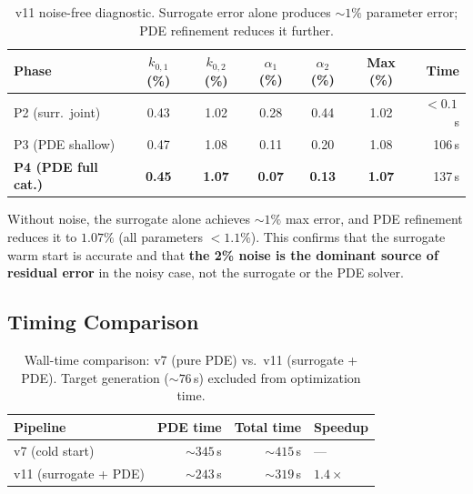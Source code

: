 \documentclass[11pt]{article}
\begin{document}
\begin{table}[htbp]
  \centering
  \caption{v11 noise-free diagnostic.  Surrogate error alone produces
           ${\sim}1\%$ parameter error; PDE refinement reduces it further.}
  \label{tab:v11_noisefree}
  \begin{tabular}{l S[round-precision=2] S[round-precision=2]
                    S[round-precision=2] S[round-precision=2]
                    S[round-precision=2] r}
    \toprule
    Phase & {$k_{0,1}$ (\%)} & {$k_{0,2}$ (\%)}
          & {$\alpha_1$ (\%)} & {$\alpha_2$ (\%)}
          & {Max (\%)} & {Time} \\
    \midrule
    P2 (surr.\ joint)           & 0.43 & 1.02 & 0.28 & 0.44 & 1.02 & $<0.1$\,s \\
    P3 (PDE shallow)            & 0.47 & 1.08 & 0.11 & 0.20 & 1.08 & 106\,s    \\
    \textbf{P4 (PDE full cat.)} &\textbf{0.45} & \textbf{1.07} & \textbf{0.07} & \textbf{0.13}
                                &\textbf{1.07} & 137\,s    \\
    \bottomrule
  \end{tabular}
\end{table}

Without noise, the surrogate alone achieves ${\sim}1\%$ max error, and PDE
refinement reduces it to $1.07\%$ (all parameters $< 1.1\%$).  This confirms
that the surrogate warm start is accurate and that \textbf{the 2\% noise is the
dominant source of residual error} in the noisy case, not the surrogate or
the PDE solver.

\subsection{Timing Comparison}

\begin{table}[htbp]
  \centering
  \caption{Wall-time comparison: v7 (pure PDE) vs.\ v11 (surrogate + PDE).
           Target generation (${\sim}76$\,s) excluded from optimization time.}
  \label{tab:v11_timing}
  \begin{tabular}{l r r l}
    \toprule
    Pipeline & {PDE time} & {Total time} & Speedup \\
    \midrule
    v7 (cold start)        & ${\sim}345$\,s & ${\sim}415$\,s & --- \\
    v11 (surrogate + PDE)  & ${\sim}243$\,s & ${\sim}319$\,s & $1.4\times$ \\
    \bottomrule
  \end{tabular}
\end{table}
\end{document}
